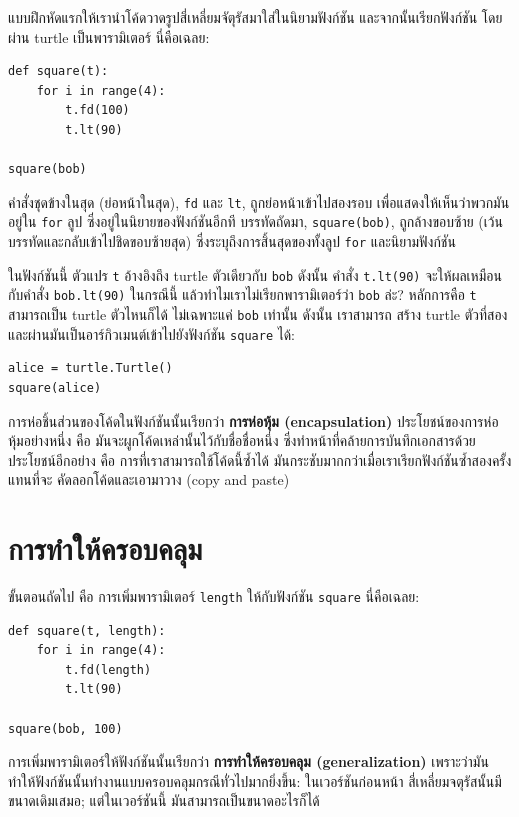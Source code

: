 แบบฝึกหัดแรกให้เรานำโค้ดวาดรูปสี่เหลี่ยมจัตุรัสมาใส่ในนิยามฟังก์ชัน และจากนั้นเรียกฟังก์ชัน
โดยผ่าน turtle เป็นพารามิเตอร์  นี่คือเฉลย:

\begin{verbatim}
def square(t):
    for i in range(4):
        t.fd(100)
        t.lt(90)

square(bob)
\end{verbatim}
%
คำสั่งชุดข้างในสุด (ย่อหน้าในสุด), {\tt fd} และ {\tt lt}, ถูกย่อหน้าเข้าไปสองรอบ 
เพื่อแสดงให้เห็นว่าพวกมันอยู่ใน {\tt for} ลูป ซึ่งอยู่ในนิยายของฟังก์ชันอีกที
บรรทัดถัดมา, {\tt square(bob)}, ถูกล้างขอบซ้าย (เว้นบรรทัดและกลับเข้าไปชิดขอบซ้ายสุด)
ซึ่งระบุถึงการสิ้นสุดของทั้งลูป {\tt for} และนิยามฟังก์ชัน

ในฟังก์ชันนี้ ตัวแปร {\tt t} อ้างอิงถึง turtle ตัวเดียวกับ {\tt bob}  ดังนั้น คำสั่ง {\tt t.lt(90)}
จะให้ผลเหมือนกับคำสั่ง {\tt bob.lt(90)}  ในกรณีนี้ แล้วทำไมเราไม่เรียกพารามิเตอร์ว่า {\tt bob} ล่ะ?
หลักการคือ {\tt t} สามารถเป็น turtle ตัวไหนก็ได้ ไม่เฉพาะแค่ {\tt bob} เท่านั้น  ดังนั้น เราสามารถ
สร้าง turtle ตัวที่สอง และผ่านมันเป็นอาร์กิวเมนต์เข้าไปยังฟังก์ชัน {\tt square} ได้:

\begin{verbatim}
alice = turtle.Turtle()
square(alice)
\end{verbatim}
%
การห่อชิ้นส่วนของโค้ดในฟังก์ชันนั้นเรียกว่า {\bf การห่อหุ้ม (encapsulation)}
ประโยชน์ของการห่อหุ้มอย่างหนึ่ง คือ มันจะผูกโค้ดเหล่านั้นไว้กับชื่อชื่อหนึ่ง ซึ่งทำหน้าที่คล้ายการบันทึกเอกสารด้วย
ประโยชน์อีกอย่าง คือ การที่เราสามารถใช้โค้ดนี้ซ้ำได้ มันกระชับมากกว่าเมื่อเราเรียกฟังก์ชันซ้ำสองครั้ง แทนที่จะ
คัดลอกโค้ดและเอามาวาง (copy and paste)


\section{การทำให้ครอบคลุม} %

ขั้นตอนถัดไป คือ การเพิ่มพารามิเตอร์ {\tt length} ให้กับฟังก์ชัน {\tt square} 
นี่คือเฉลย:

\begin{verbatim}
def square(t, length):
    for i in range(4):
        t.fd(length)
        t.lt(90)

square(bob, 100)
\end{verbatim}
%
การเพิ่มพารามิเตอร์ให้ฟังก์ชันนั้นเรียกว่า {\bf การทำให้ครอบคลุม (generalization)}
เพราะว่ามันทำให้ฟังก์ชันนั้นทำงานแบบครอบคลุมกรณีทั่วไปมากยิ่งขึ้น: ในเวอร์ชันก่อนหน้า 
สี่เหลี่ยมจตุรัสนั้นมีขนาดเดิมเสมอ; แต่ในเวอร์ชันนี้ มันสามารถเป็นขนาดอะไรก็ได้

